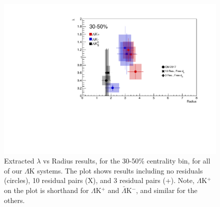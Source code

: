 \documentclass[../AnalysisNoteJBuxton.tex]{subfiles}
\begin{document}
\begin{figure}[h]
  \centering
  \includegraphics[width=\textwidth]{7_ResultsAndDiscussion/Figures/CompareAllRadiusvsLambdaAcrossAnalyses_3050_10ResAnd3Res_10and3SeparateOnly_FreeD0Only.pdf}
  \caption[$\lambda$ vs. R (30-50\% Centrality)]{Extracted $\lambda$ vs Radius results, for the 30-50\% centrality bin, for all of our $\Lambda$K systems.  The plot shows results including no residuals (circles), 10 residual pairs (X), and 3 residual pairs (+).  Note, $\Lambda$K$^{+}$ on the plot is shorthand for $\Lambda$K$^{+}$ and $\bar{\Lambda}$K$^{-}$, and similar for the others.}
  \label{fig:LambdavsR_3050_FreeD0Only}
\end{figure}

\clearpage




\end{document}
